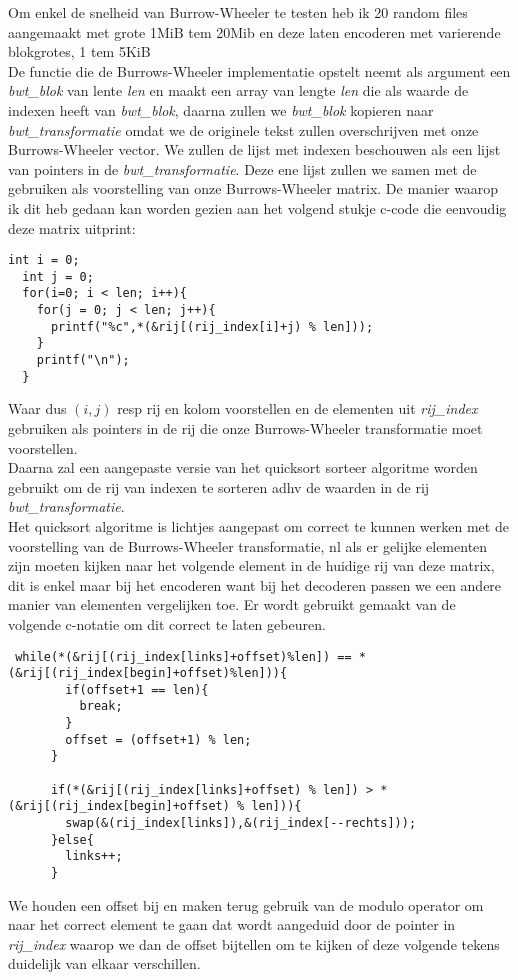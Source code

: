 \documentclass[10pt,a4paper]{report}
\begin{document}
Om enkel de snelheid van Burrow-Wheeler te testen heb ik 20 random files aangemaakt met grote 1MiB tem 20Mib en deze laten encoderen met varierende blokgrotes, 1 tem 5KiB\\

De functie die de Burrows-Wheeler implementatie opstelt neemt als argument een \emph{bwt\_blok} van lente \emph{len} en maakt een array van lengte \emph{len} die als waarde de indexen heeft van \emph{bwt\_blok}, daarna zullen we \emph{bwt\_blok} kopieren naar \emph{bwt\_transformatie} omdat we de originele tekst zullen overschrijven met onze Burrows-Wheeler vector. We zullen de lijst met indexen beschouwen als een lijst van pointers in de \emph{bwt\_transformatie}. Deze ene lijst zullen we samen met de gebruiken als voorstelling van onze Burrows-Wheeler matrix. De manier waarop ik dit heb gedaan kan worden gezien aan het volgend stukje c-code die eenvoudig deze matrix uitprint:

\begin{lstlisting}
int i = 0;
  int j = 0;
  for(i=0; i < len; i++){
    for(j = 0; j < len; j++){
      printf("%c",*(&rij[(rij_index[i]+j) % len]));
    }
    printf("\n");
  }
\end{lstlisting}
Waar dus $(i,j)$ resp rij en kolom voorstellen en de elementen uit \emph{rij\_index} gebruiken als pointers in de rij die onze Burrows-Wheeler transformatie moet voorstellen. \\

Daarna zal een aangepaste versie van het quicksort sorteer algoritme worden gebruikt om de rij van indexen te sorteren adhv de waarden in de rij \emph{bwt\_transformatie}.\\

Het quicksort algoritme is lichtjes aangepast om correct te kunnen werken met de voorstelling van de Burrows-Wheeler transformatie, nl als er gelijke elementen zijn moeten kijken naar het volgende element in de huidige rij van deze matrix, dit is enkel maar bij het encoderen want bij het decoderen passen we een andere manier van elementen vergelijken toe. Er wordt gebruikt gemaakt van de volgende c-notatie om dit correct te laten gebeuren. 
\begin{lstlisting}
 while(*(&rij[(rij_index[links]+offset)%len]) == *(&rij[(rij_index[begin]+offset)%len])){
	    if(offset+1 == len){	  
	      break;
	    } 
	    offset = (offset+1) % len;
	  }
	  
	  if(*(&rij[(rij_index[links]+offset) % len]) > *(&rij[(rij_index[begin]+offset) % len])){
	    swap(&(rij_index[links]),&(rij_index[--rechts]));
	  }else{
	    links++;	  
	  }
\end{lstlisting}
We houden een offset bij en maken terug gebruik van de modulo operator om naar het correct element te gaan dat wordt aangeduid door de pointer in \emph{rij\_index} waarop we dan de offset bijtellen om te kijken of deze volgende tekens duidelijk van elkaar verschillen.\\
\end{document}

